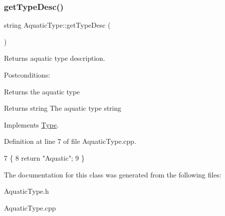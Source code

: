 \subsubsection{\texorpdfstring{get\+Type\+Desc()}{getTypeDesc()}}
{\footnotesize\ttfamily string Aquatic\+Type\+::get\+Type\+Desc (\begin{DoxyParamCaption}{ }\end{DoxyParamCaption})\hspace{0.3cm}{\ttfamily [virtual]}}



Returns aquatic type description. 

Postconditions\+:
\begin{DoxyItemize}
\item Returns the aquatic type
\end{DoxyItemize}

\begin{DoxyReturn}{Returns}
string The aquatic type string 
\end{DoxyReturn}


Implements \hyperlink{classType_a5c453300dc060252c30534110bd2f78c}{Type}.



Definition at line 7 of file Aquatic\+Type.\+cpp.


\begin{DoxyCode}
7                                 \{
8     \textcolor{keywordflow}{return} \textcolor{stringliteral}{"Aquatic"};
9 \}
\end{DoxyCode}


The documentation for this class was generated from the following files\+:\begin{DoxyCompactItemize}
\item 
Aquatic\+Type.\+h\item 
Aquatic\+Type.\+cpp\end{DoxyCompactItemize}
